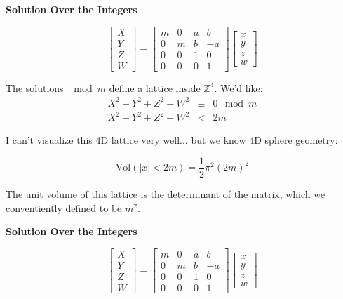 \documentclass[12pt]{article}
\begin{document}
\newpage


\textbf{Solution Over the Integers}

$$ 
\left[\begin{array}{c} X \\ Y \\ Z \\ W \end{array} \right] = 
\left[ \begin{array}{cc|cr} m & 0 & a & b \\
0 & m & b & -a \\ \hline
0 & 0 & 1 & 0 \\
0 & 0 & 0 & 1  \end{array} \right] \left[\begin{array}{c} x \\ y \\ z \\ w \end{array} \right]$$

\noindent The solutions $\mod m$ define a lattice inside $\mathbb{Z}^4$.  We'd like:
\begin{eqnarray*} X^2 + Y^2 + Z^2 + W^2 & \equiv &  0 \mod m  \\ 
X^2 + Y^2 + Z^2 + W^2 & < &  2m  \end{eqnarray*}

\noindent I can't visualize this 4D lattice very well... but we know 4D sphere geometry:

$$ \mathrm{Vol}(|x| < 2m) = \frac{1}{2} \pi^2 (2m)^2  $$

\noindent The unit volume of this lattice is the determinant of the matrix, which we conventiently defined to be $m^2$.  

\newpage


\textbf{Solution Over the Integers}

$$ 
\left[\begin{array}{c} X \\ Y \\ Z \\ W \end{array} \right] = 
\left[ \begin{array}{cc|cr} m & 0 & a & b \\
0 & m & b & -a \\ \hline
0 & 0 & 1 & 0 \\
0 & 0 & 0 & 1  \end{array} \right] \left[\begin{array}{c} x \\ y \\ z \\ w \end{array} \right]$$
\end{document}
